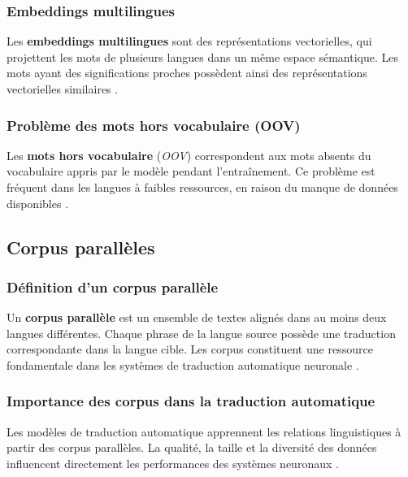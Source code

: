 \subsubsection{Embeddings multilingues}

Les \textbf{embeddings multilingues} sont des représentations vectorielles, qui projettent les mots de plusieurs langues dans un même espace sémantique. Les mots ayant des significations proches possèdent ainsi des représentations vectorielles similaires \cite{ali2026hybrid, meyer2024systematic}.

\subsubsection{Problème des mots hors vocabulaire (OOV)}

Les \textbf{mots hors vocabulaire} (\textit{\ac{OOV}}) correspondent aux mots absents du vocabulaire appris par le modèle pendant l'entraînement. Ce problème est fréquent dans les langues à faibles ressources, en raison du manque de données disponibles \cite{ranathunga2023neural, toraman2022impact}.

\subsection{Corpus parallèles}

\subsubsection{Définition d'un corpus parallèle}

Un \textbf{corpus parallèle} est un ensemble de textes alignés dans au moins deux langues différentes. Chaque phrase de la langue source possède une traduction correspondante dans la langue cible. Les corpus constituent une ressource fondamentale dans les systèmes de traduction automatique neuronale \cite{ranathunga2023neural, haulai2023construction}.

\subsubsection{Importance des corpus dans la traduction automatique}

Les modèles de traduction automatique apprennent les relations linguistiques à partir des corpus parallèles. La qualité, la taille et la diversité des données influencent directement les performances des systèmes neuronaux \cite{ranathunga2023neural, agyei2024low}.

